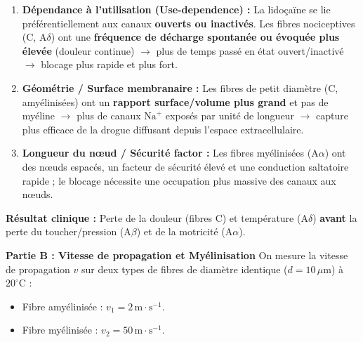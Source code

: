 \documentclass[11pt]{article}
\begin{document}
\begin{exercice}
\begin{enumerate}
\begin{enumerate}
\item \textbf{Dépendance à l'utilisation (Use-dependence) :} La lidoçaïne se lie préférentiellement aux canaux \textbf{ouverts ou inactivés}. Les fibres nociceptives (C, A$\delta$) ont une \textbf{fréquence de décharge spontanée ou évoquée plus élevée} (douleur continue) $\to$ plus de temps passé en état ouvert/inactivé $\to$ blocage plus rapide et plus fort.
\item \textbf{Géométrie / Surface membranaire :} Les fibres de petit diamètre (C, amyélinisées) ont un \textbf{rapport surface/volume plus grand} et pas de myéline $\to$ plus de canaux $\text{Na}^+$ exposés par unité de longueur $\to$ capture plus efficace de la drogue diffusant depuis l'espace extracellulaire.
\item \textbf{Longueur du nœud / Sécurité factor :} Les fibres myélinisées (A$\alpha$) ont des nœuds espacés, un facteur de sécurité élevé et une conduction saltatoire rapide ; le blocage nécessite une occupation plus massive des canaux aux nœuds.
\end{enumerate}
\par \textbf{Résultat clinique :} Perte de la douleur (fibres C) et température (A$\delta$) \textbf{avant} la perte du toucher/pression (A$\beta$) et de la motricité (A$\alpha$).
\end{enumerate}

\textbf{Partie B : Vitesse de propagation et Myélinisation}
On mesure la vitesse de propagation $v$ sur deux types de fibres de diamètre identique ($d = 10\,\mu\text{m}$) à $20^\circ\text{C}$ :
\begin{itemize}
\item Fibre amyélinisée : $v_1 = 2\,\text{m}\cdot\text{s}^{-1}$.
\item Fibre myélinisée : $v_2 = 50\,\text{m}\cdot\text{s}^{-1}$.
\end{itemize}


\end{exercice}
\end{document}
